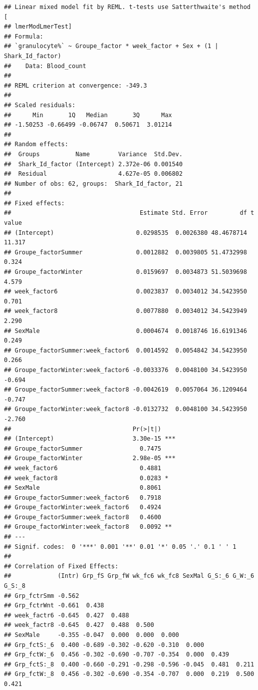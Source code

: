 \documentclass[
]{article}
\begin{document}
\begin{verbatim}
## Linear mixed model fit by REML. t-tests use Satterthwaite's method [
## lmerModLmerTest]
## Formula: 
## `granulocyte%` ~ Groupe_factor * week_factor + Sex + (1 | Shark_Id_factor)
##    Data: Blood_count
## 
## REML criterion at convergence: -349.3
## 
## Scaled residuals: 
##      Min       1Q   Median       3Q      Max 
## -1.50253 -0.66499 -0.06747  0.50671  3.01214 
## 
## Random effects:
##  Groups          Name        Variance  Std.Dev.
##  Shark_Id_factor (Intercept) 2.372e-06 0.001540
##  Residual                    4.627e-05 0.006802
## Number of obs: 62, groups:  Shark_Id_factor, 21
## 
## Fixed effects:
##                                    Estimate Std. Error         df t value
## (Intercept)                       0.0298535  0.0026380 48.4678714  11.317
## Groupe_factorSummer               0.0012882  0.0039805 51.4732998   0.324
## Groupe_factorWinter               0.0159697  0.0034873 51.5039698   4.579
## week_factor6                      0.0023837  0.0034012 34.5423950   0.701
## week_factor8                      0.0077880  0.0034012 34.5423949   2.290
## SexMale                           0.0004674  0.0018746 16.6191346   0.249
## Groupe_factorSummer:week_factor6  0.0014592  0.0054842 34.5423950   0.266
## Groupe_factorWinter:week_factor6 -0.0033376  0.0048100 34.5423950  -0.694
## Groupe_factorSummer:week_factor8 -0.0042619  0.0057064 36.1209464  -0.747
## Groupe_factorWinter:week_factor8 -0.0132732  0.0048100 34.5423950  -2.760
##                                  Pr(>|t|)    
## (Intercept)                      3.30e-15 ***
## Groupe_factorSummer                0.7475    
## Groupe_factorWinter              2.98e-05 ***
## week_factor6                       0.4881    
## week_factor8                       0.0283 *  
## SexMale                            0.8061    
## Groupe_factorSummer:week_factor6   0.7918    
## Groupe_factorWinter:week_factor6   0.4924    
## Groupe_factorSummer:week_factor8   0.4600    
## Groupe_factorWinter:week_factor8   0.0092 ** 
## ---
## Signif. codes:  0 '***' 0.001 '**' 0.01 '*' 0.05 '.' 0.1 ' ' 1
## 
## Correlation of Fixed Effects:
##             (Intr) Grp_fS Grp_fW wk_fc6 wk_fc8 SexMal G_S:_6 G_W:_6 G_S:_8
## Grp_fctrSmm -0.562                                                        
## Grp_fctrWnt -0.661  0.438                                                 
## week_factr6 -0.645  0.427  0.488                                          
## week_factr8 -0.645  0.427  0.488  0.500                                   
## SexMale     -0.355 -0.047  0.000  0.000  0.000                            
## Grp_fctS:_6  0.400 -0.689 -0.302 -0.620 -0.310  0.000                     
## Grp_fctW:_6  0.456 -0.302 -0.690 -0.707 -0.354  0.000  0.439              
## Grp_fctS:_8  0.400 -0.660 -0.291 -0.298 -0.596 -0.045  0.481  0.211       
## Grp_fctW:_8  0.456 -0.302 -0.690 -0.354 -0.707  0.000  0.219  0.500  0.421
\end{verbatim}
\end{document}
